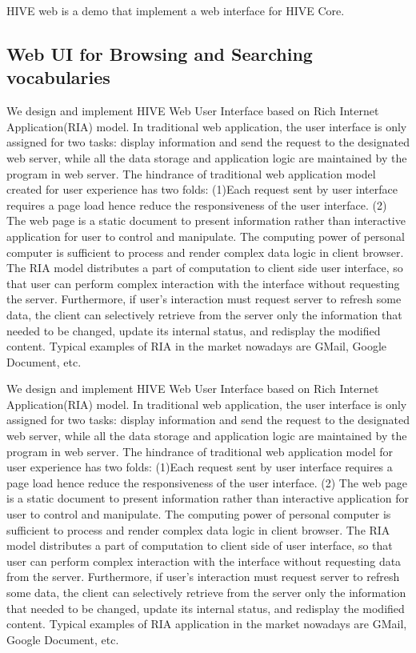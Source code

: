 HIVE web is a demo that implement a web interface for HIVE Core.

\subsection{Web UI for Browsing and Searching vocabularies}

We design and implement HIVE Web User Interface based on Rich Internet Application(RIA) model. 
In traditional web application, the user interface is only assigned for two tasks: display 
information and send the request to the designated web server, while all the data storage and application 
logic are maintained by the program in web server. The hindrance of traditional web application model 
created for user experience has two folds:  (1)Each request sent by user interface requires a page load 
hence reduce the responsiveness of the user interface. (2) The web page is a static document to present 
information rather than interactive application for user to control and manipulate. The computing power 
of personal computer is sufficient to process and render complex data logic in client browser. The RIA 
model distributes a part of computation to client side user interface, so that user can perform complex 
interaction with the interface without requesting the server. Furthermore, if user's interaction must 
request server to refresh some data, the client can selectively retrieve from the server only the 
information that needed to be changed, update its internal status, and redisplay the modified content.
Typical examples of RIA in the market nowadays are GMail, Google Document, etc.

We design and implement HIVE Web User Interface based on Rich Internet Application(RIA) model. In traditional 
web application, the user interface is only assigned for two tasks: display information and send the request 
to the designated web server, while all the data storage and application logic are maintained by the program 
in web server. The hindrance of traditional web application model for user experience has two folds:  
(1)Each request sent by user interface requires a page load hence reduce the responsiveness of the user interface. 
(2) The web page is a static document to present information rather than interactive application for user to 
control and manipulate. The computing power of personal computer is sufficient to process and render complex 
data logic in client browser. The RIA model distributes a part of computation to client side of user interface, 
so that user can perform complex interaction with the interface without requesting data from the server. 
Furthermore, if user's interaction must request server to refresh some data, the client can selectively retrieve 
from the server only the information that needed to be changed, update its internal status, and redisplay the 
modified content. Typical examples of RIA application in the market nowadays are GMail, Google Document, etc. 

